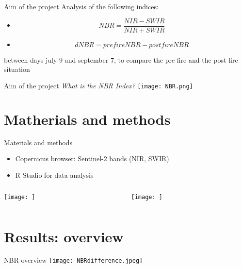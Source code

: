 \documentclass{beamer}
\begin{document}
\begin{frame}{Aim of the project}
Analysis of the following indices:
\begin{itemize}
    \item \begin{equation}
NBR=\frac{NIR-SWIR}{NIR+SWIR}
    \end{equation}
    \item  \begin{equation}
dNBR=prefireNBR - postfireNBR
    \end{equation}
\end{itemize}
between days july 9 and september 7, to compare the pre fire and the post fire situation
\end{frame}

\begin{frame}{Aim of the project}
\textit{What is the NBR Index?}
\texttt{[image: NBR.png]}
\end{frame}


\section{Matherials and methods}

\begin{frame}{Materials and methods}
\begin{itemize}
    \item Copernicus browser: Sentinel-2 bands (NIR, SWIR)
    \item R Studio for data analysis
\end{itemize}
\begin{columns}
    \begin{column}{0.5\textwidth}
        \texttt{[image: ]}
    \end{column}
    \begin{column}{0.5\textwidth}
    \texttt{[image: ]}
    \end{column}
\end{columns}
\end{frame}

\section{Results: overview}
\begin{frame}{NBR overview}
\texttt{[image: NBRdifference.jpeg]}
\end{frame}
\end{document}
